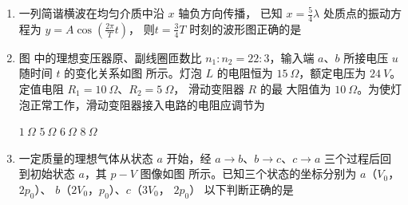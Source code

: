 \begin{enumerate}
\item
一列简谐横波在均匀介质中沿 $ x $ 轴负方向传播，
已知 $ x= \frac{ 5 }{ 4 } \lambda $ 处质点的振动方程为 $y=A \cos \left(\frac{2 \pi}{T} t\right)$，
则$ t= \frac{ 3 }{ 4 } T $
时刻的波形图正确的是  

\pfourchoices
{}
{}
{}
{}







\item
图  中的理想变压器原、副线圈匝数比 $ n_{1}:n_{2}=22:3 $，输入端 $ a $、$ b $ 所接电压 $ u $ 随时间 $ t $ 的变化关系如图  所示。灯泡 $ L $ 的电阻恒为 $ 15 \ \Omega $，额定电压为 $ 24 \ V $。定值电阻 $ R_{1} =10 \ \Omega $、$ R_{2} =5 \ \Omega $， 滑动变阻器 $ R $ 的最
大阻值为 $ 10 \ \Omega $。为使灯泡正常工作，滑动变阻器接入电路的电阻应调节为  

\begin{figure}[h!]
\centering
\begin{subfigure}{0.4\linewidth}
\centering
 
\caption{}\label{2020:山东:5a}
\end{subfigure}
\begin{subfigure}{0.4\linewidth}
\centering
 
\caption{}\label{2020:山东:5b}
\end{subfigure}	
\end{figure}


\fourchoices
{$ 1 \ \Omega $}
{$ 5 \ \Omega $}
{$ 6 \ \Omega $}
{$ 8 \ \Omega $}





\item
一定质量的理想气体从状态 $ a $ 开始，经 $ a \rightarrow b $、$ b \rightarrow c $、$ c \rightarrow a $ 三个过程后回到初始状态 $ a $，其 $ p-V $ 图像如图
所示。已知三个状态的坐标分别为 $ a $（$ V_{0} $， $ 2p_0 $）、 $ b $（$ 2V_0 $，$ p_{0} $）、$ c $（$ 3V_0 $， $ 2p_0 $） 以下判断正确的是  
\begin{figure}[h!]
\centering

\end{figure}



\end{enumerate}
